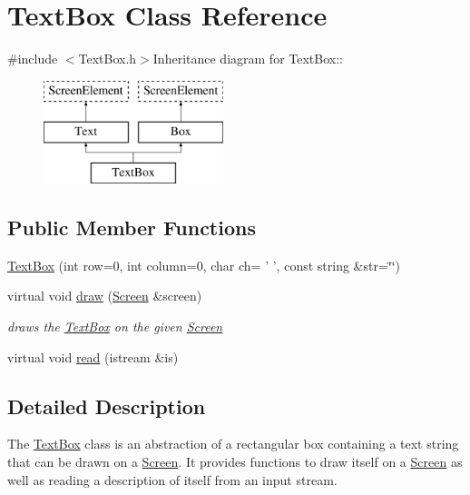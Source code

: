 \hypertarget{classTextBox}{
\section{TextBox Class Reference}
\label{classTextBox}
}


{\ttfamily \#include $<$TextBox.h$>$}Inheritance diagram for TextBox::\begin{figure}[H]
\begin{center}
\leavevmode
\includegraphics[height=3cm]{classTextBox}
\end{center}
\end{figure}
\subsection*{Public Member Functions}
\begin{DoxyCompactItemize}
\item 
\hyperlink{classTextBox_ac0d2d825a2ca3f37f8d417c437032d71}{TextBox} (int row=0, int column=0, char ch= ' ', const string \&str=\char`\"{}\char`\"{})
\item 
virtual void \hyperlink{classTextBox_ae28a00e6cd50d5432c02b579b0fb32ed}{draw} (\hyperlink{classScreen}{Screen} \&screen)
\begin{DoxyCompactList}\small\item\em draws the \hyperlink{classTextBox}{TextBox} on the given \hyperlink{classScreen}{Screen} \item\end{DoxyCompactList}\item 
virtual void \hyperlink{classTextBox_a3265df3298f92813667d1c70479f7f5c}{read} (istream \&is)
\end{DoxyCompactItemize}


\subsection{Detailed Description}
The \hyperlink{classTextBox}{TextBox} class is an abstraction of a rectangular box containing a text string that can be drawn on a \hyperlink{classScreen}{Screen}. It provides functions to draw itself on a \hyperlink{classScreen}{Screen} as well as reading a description of itself from an input stream. 

